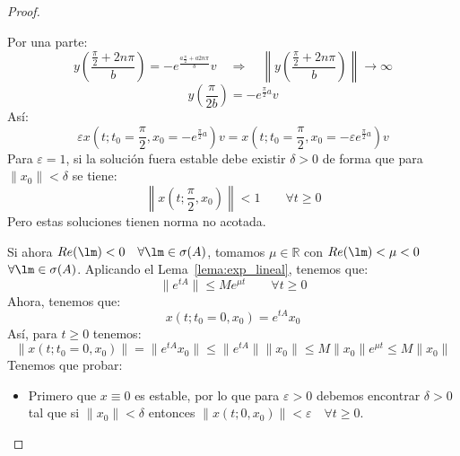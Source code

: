 \begin{teo}
\begin{proof}
\begin{itemize}
                Por una parte:
                \begin{equation*}
                    y\left(\frac{\frac{\pi}{2}+2n\pi}{b}\right) = -e^{\frac{a\frac{\pi}{2}+a2n\pi}{b}}v
                    \quad\Longrightarrow\quad
                    \left\|y\left(\frac{\frac{\pi}{2}+2n\pi}{b}\right)\right\|\to \infty
                \end{equation*}
                \begin{equation*}
                    y\left(\frac{\pi}{2b}\right) = -e^{\frac{\pi}{2}a}v
                \end{equation*}
                Así:
                \begin{equation*}
                    \varepsilon x\left(t;t_0=\frac{\pi}{2},x_0 = -e^{\frac{\pi}{2}a}\right)v = x\left(t;t_0=\frac{\pi}{2},x_0 = -\varepsilon e^{\frac{\pi}{2}a}\right)v 
                \end{equation*}
                Para $\varepsilon=1$, si la solución fuera estable debe existir $\delta>0$ de forma que para $\|x_0\|<\delta$ se tiene:
                \begin{equation*}
                    \left\|x\left(t;\frac{\pi}{2},x_0\right)\right\|<1 \qquad \forall t\geq 0
                \end{equation*}
                Pero estas soluciones tienen norma no acotada.
        \end{itemize}
        Si ahora $Re(\lm)<0\quad \forall \lm \in \sigma(A)$, tomamos $\mu \in \mathbb{R}$ con $Re(\lm)<\mu<0$ $\forall \lm\in \sigma(A)$. Aplicando el Lema~\ref{lema:exp_lineal}, tenemos que:
        \begin{equation*}
            \|e^{tA}\| \leq Me^{\mu t} \qquad \forall t\geq 0
        \end{equation*}
        Ahora, tenemos que:
        \begin{equation*}
            x(t;t_0=0,x_0) = e^{tA}x_0
        \end{equation*}
        Así, para $t\geq 0$ tenemos:
        \begin{equation*}
            \|x(t;t_0=0,x_0)\| = \|e^{tA}x_0\| \leq \|e^{tA}\|\|x_0\| \leq M\|x_0\|e^{\mu t} \leq M\|x_0\|
        \end{equation*}
        Tenemos que probar:
        \begin{itemize}
            \item Primero que $x\equiv 0$ es estable, por lo que para $\varepsilon>0$ debemos encontrar $\delta>0$ tal que si $\|x_0\|<\delta$ entonces $\|x(t;0,x_0)\| < \varepsilon\quad \forall t\geq 0$.


\end{itemize}
\end{proof}
\end{teo}
